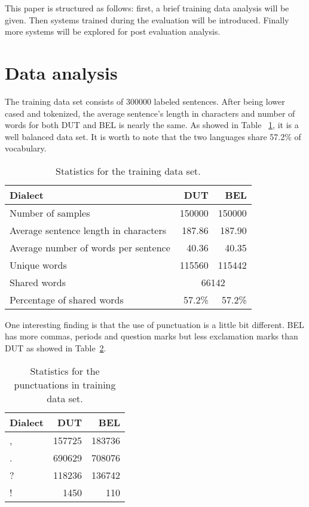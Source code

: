 \documentclass[11pt]{article}
\begin{document}
This paper is structured as follows: first, a brief training data analysis will be given. Then systems trained during the evaluation will be introduced. Finally more systems will be explored for post evaluation analysis.

\section{Data analysis}

The training data set consists of 300000 labeled sentences. After being lower cased and tokenized, the average sentence's length in characters and number of words for both DUT and BEL is nearly the same. As showed in Table ~\ref{vocab}, it is a well balanced data set. It is worth to note that the two languages share 57.2\% of vocabulary.

 
\begin{table}[h]
	\centering
	
	
	\begin{tabular}{|l|r|r|}
		\hline
		
		Dialect & DUT & BEL \\ \hline
		Number of samples & 150000 & 150000  \\ \hline
		Average sentence length in characters & 187.86 & 187.90 \\ \hline
		Average number of words per sentence & 40.36 & 40.35 \\ \hline
		Unique words & 115560 & 115442 \\ \hline 
		Shared words & \multicolumn{2}{|c|}{66142}  \\ \hline
		Percentage of shared words & 57.2\% & 57.2\%  \\ \hline
	\end{tabular}
	\caption{Statistics for the training data set.}
	\label{vocab}
\end{table}

One interesting finding is that the use of punctuation is a little bit different. BEL has more commas, periods and question marks but less exclamation marks than DUT as showed in Table~\ref{punctuations}.

\begin{table}[h]
	\centering
	
	
	\begin{tabular}{|l|r|r|}
		\hline
		Dialect & DUT & BEL \\ \hline
		, & 157725 & 183736  \\ \hline
		. & 690629 & 708076 \\ \hline
		? & 118236 & 136742 \\ \hline
		! & 1450 & 110 \\ \hline 
	
	\end{tabular}
	\caption{Statistics for the punctuations in training data set.}
	\label{punctuations}
\end{table}
\end{document}
